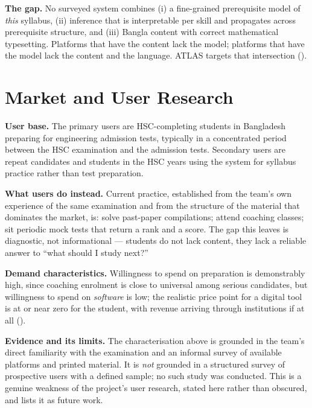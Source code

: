 \noindent\textbf{The gap.} No surveyed system combines (i) a fine-grained
prerequisite model of \emph{this} syllabus, (ii) inference that is interpretable
per skill and propagates across prerequisite structure, and (iii) Bangla content
with correct mathematical typesetting. Platforms that have the content lack the
model; platforms that have the model lack the content and the language. ATLAS
targets that intersection ().



\section{Market and User Research}
\label{sec:market}

\textbf{User base.} The primary users are HSC-completing students in Bangladesh
preparing for engineering admission tests, typically in a concentrated period
between the HSC examination and the admission tests. Secondary users are
repeat candidates and students in the HSC years using the system for syllabus
practice rather than test preparation.

\textbf{What users do instead.} Current practice, established from the team's
own experience of the same examination and from the structure of the material
that dominates the market, is: solve past-paper compilations; attend coaching
classes; sit periodic mock tests that return a rank and a score. The gap this
leaves is diagnostic, not informational --- students do not lack content, they
lack a reliable answer to ``what should I study next?''

\textbf{Demand characteristics.} Willingness to spend on preparation is
demonstrably high, since coaching enrolment is close to universal among serious
candidates, but willingness to spend on \emph{software} is low; the realistic
price point for a digital tool is at or near zero for the student, with revenue
arriving through institutions if at all ().

\textbf{Evidence and its limits.} The characterisation above is grounded in the
team's direct familiarity with the examination and an informal survey of
available platforms and printed material. It is \emph{not} grounded in a
structured survey of prospective users with a defined sample; no such study was
conducted. This is a genuine weakness of the project's user research, stated
here rather than obscured, and  lists it as future work.

